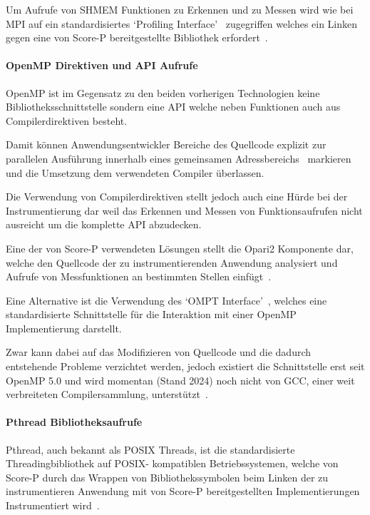 \documentclass[german,proseminar,hyperref,utf8]{zihpub}
\begin{document}
    Um Aufrufe von SHMEM Funktionen zu Erkennen und zu Messen wird wie bei MPI auf ein standardisiertes
    `Profiling Interface'~ zugegriffen welches ein Linken gegen eine von
    Score-P bereitgestellte Bibliothek erfordert~.

    \paragraph{OpenMP Direktiven und API Aufrufe}
    OpenMP ist im Gegensatz zu den beiden vorherigen Technologien keine Bibliotheksschnittstelle
    sondern eine API welche neben Funktionen auch aus Compilerdirektiven besteht.

    Damit können Anwendungsentwickler Bereiche des Quellcode explizit zur parallelen Ausführung
    innerhalb eines gemeinsamen Adressbereichs~ markieren und die Umsetzung 
    dem verwendeten Compiler überlassen.

    Die Verwendung von Compilerdirektiven stellt jedoch auch eine Hürde bei der Instrumentierung dar
    weil das Erkennen und Messen von Funktionsaufrufen nicht ausreicht um die komplette API abzudecken.

    Eine der von Score-P verwendeten Lösungen stellt die Opari2 Komponente dar, welche den Quellcode der
    zu instrumentierenden Anwendung analysiert und Aufrufe von Messfunktionen an bestimmten Stellen
    einfügt~.

    Eine Alternative ist die Verwendung des `OMPT Interface'~, welches eine
    standardisierte Schnittstelle für die Interaktion mit einer OpenMP Implementierung darstellt.

    Zwar kann dabei auf das Modifizieren von Quellcode und die dadurch entstehende Probleme verzichtet werden,
    jedoch existiert die Schnittstelle erst seit OpenMP 5.0 und wird momentan (Stand 2024) noch nicht von
    GCC, einer weit verbreiteten Compilersammlung, unterstützt~\cite{gomp}. 

    \paragraph{Pthread Bibliotheksaufrufe}
    Pthread, auch bekannt als POSIX Threads, ist die standardisierte Threadingbibliothek auf POSIX-
    kompatiblen Betriebssystemen, welche von Score-P durch das Wrappen von Bibliothekssymbolen
    beim Linken der zu instrumentieren Anwendung mit von Score-P bereitgestellten
    Implementierungen Instrumentiert wird~.
\end{document}

